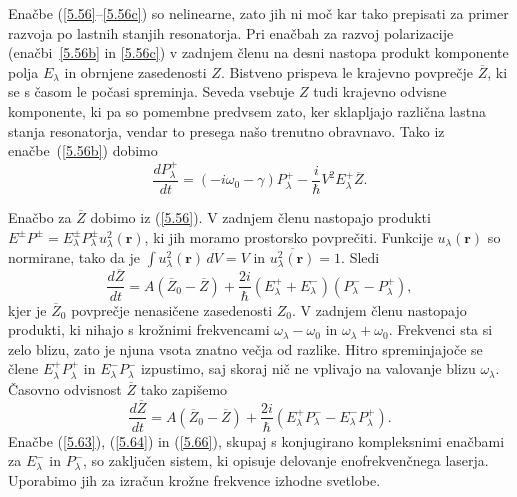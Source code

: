 Enačbe (\ref{5.56}--\ref{5.56c}) so nelinearne, zato jih ni moč kar tako
prepisati za primer razvoja po lastnih stanjih resonatorja. Pri enačbah za
razvoj polarizacije (enačbi~\ref{5.56b} in \ref{5.56c}) v zadnjem členu na desni 
nastopa produkt komponente polja $E_{\lambda}$ in obrnjene zasedenosti $Z$. Bistveno
prispeva le krajevno povprečje $\overline{Z}$, ki se s časom le počasi spreminja.
Seveda vsebuje $Z$ tudi krajevno odvisne komponente, ki pa so pomembne 
predvsem zato, ker sklapljajo različna lastna stanja resonatorja, vendar to
presega našo trenutno obravnavo. Tako iz enačbe~(\ref{5.56b}) dobimo
\begin{equation}  
\label{5.64}
\frac{d P_\lambda^+}{dt}=\left(-i \omega_0-\gamma\right)P_\lambda^{+}-\frac{i}{\hbar}
V^2 E_\lambda^+ \overline{Z}.
\end{equation}

Enačbo za $\overline{Z}$ dobimo iz (\ref{5.56}). V zadnjem členu nastopajo produkti 
$E^{\pm}P^{\pm}=E_{\lambda}^{\pm}P_{\lambda}^{\pm} u_{\lambda}^2\left(\mathbf{r}\right)$,
ki jih moramo prostorsko povprečiti. Funkcije $u_{\lambda}\left(\mathbf{r}\right)$ so
normirane, tako da je $\int u_{\lambda}^2\left(\mathbf{r}\right) \,dV=V$ in $\overline{u_{\lambda}^2\left(\mathbf{r}\right)}=1$.
Sledi
\begin{equation}  
\label{5.65}
\frac{d\overline{Z}}{dt}= A\left(\overline{Z}_0-\overline{Z}\right)+ \frac{2i}{\hbar}\left(E_{\lambda}^+
+E_{\lambda}^-\right)\left(P_{\lambda}^- - P_{\lambda}^+\right),
\end{equation}
kjer je $\overline{Z}_0$ povprečje nenasičene zasedenosti $Z_0$. V zadnjem
členu nastopajo produkti, ki nihajo s krožnimi frekvencami $\omega_{\lambda}-
\omega_0$ in $\omega_{\lambda}+ \omega_0$. Frekvenci sta si zelo blizu,
zato je njuna vsota znatno večja od razlike. Hitro spreminjajoče se člene 
$E_{\lambda}^+P_{\lambda}^+$ in $E_{\lambda}^- P_{\lambda}^-$ izpustimo, 
saj skoraj nič ne vplivajo na valovanje blizu $\omega_{\lambda}$. Časovno odvisnost 
$\overline{Z}$ tako zapišemo 
\begin{equation}  
\label{5.66}
\frac{d\overline{Z}}{dt}= A\left(\overline{Z}_0-\overline{Z}\right)+\frac{2i}{\hbar}\left(E_{\lambda}^+
P_{\lambda}^- - E_{\lambda}^- P_{\lambda}^+\right).
\end{equation}
Enačbe (\ref{5.63}), (\ref{5.64}) in (\ref{5.66}), skupaj s konjugirano
kompleksnimi enačbami za $E_{\lambda}^-$ in $P_{\lambda}^-$, so zaključen
sistem, ki opisuje delovanje enofrekvenčnega laserja. Uporabimo jih za
izračun krožne frekvence izhodne svetlobe.


